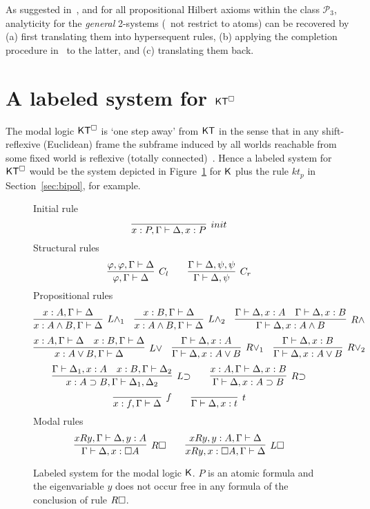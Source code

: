 \documentclass{llncs}
\begin{document}
As suggested in~\cite{DBLP:journals/tocl/CiabattoniG18}, and for all propositional Hilbert axioms within the class $\mathcal{P}_3$, analyticity for the {\em general} 2-systems (\ie\ not restrict to atoms) can be recovered by (a) first translating them into hypersequent rules, (b) applying the completion procedure in~\cite{DBLP:conf/lics/CiabattoniGT08} to the latter, and (c) translating them back. 


\section{A labeled system for $\mathsf{K}\mathsf{T}^\Box$}
The modal logic $\mathsf{K}\mathsf{T}^\Box$ is `one step away' from  $\mathsf{K}\mathsf{T}$ in the sense that in any shift-reflexive (Euclidean) frame the subframe induced by all worlds reachable from some fixed world is reflexive (totally connected)~\cite{DBLP:conf/tableaux/Lang23}. Hence a labeled system for $\mathsf{K}\mathsf{T}^\Box$ would be the system depicted in Figure~\ref{fig:labk} for $\mathsf{K}$ plus the rule $kt_p$ in Section~\ref{sec:bipol}, for example.

\begin{figure}[t]%
{\sc Initial rule}
\[
  \infer[\init]{{x:P,\Gamma}\vdash{\Delta, x:P}}{}
\]
{\sc Structural rules}	
\[
  \infer[C_l]{\varphi, \Gamma \vdash \Delta}{\varphi, \varphi, \Gamma \vdash \Delta}
  \qquad
  \infer[C_r]{\Gamma \vdash \Delta, \psi}{\Gamma \vdash \Delta, \psi, \psi}
\]
{\sc Propositional rules}
\[
  \infer[\lwedge_1]{x:A\wedge B, \Gamma \vdash \Delta}{x:A, \Gamma \vdash \Delta}
  \quad
    \infer[\lwedge_2]{x:A\wedge B, \Gamma \vdash \Delta}{x:B, \Gamma \vdash \Delta}
 \quad
  \infer[\rwedge]{\Gamma \vdash \Delta, x:A \wedge B}{\Gamma \vdash \Delta, x:A & \Gamma \vdash \Delta, x:B}	
\]
\[
  \infer[\lvee]{x:A\vee B, \Gamma \vdash \Delta}{x:A,\Gamma \vdash \Delta & x:B,\Gamma \vdash \Delta}
  \quad
  \infer[\rvee_1]{\Gamma \vdash \Delta, x:A \vee B}{\Gamma \vdash \Delta, x:A}
  \quad
  \infer[\rvee_2]{\Gamma \vdash \Delta, x:A \vee B}{\Gamma \vdash \Delta, x:B}
\]
\[
  \infer[\limpl]{x:A\impl B, \Gamma \vdash \Delta_1,\Delta_2}{\Gamma \vdash \Delta_1, x:A & x:B,\Gamma \vdash \Delta_2}
  \qquad
  \infer[\rimpl]{\Gamma \vdash \Delta, x:A \impl B}{x:A, \Gamma \vdash \Delta, x:B}
\]
\[
  \infer[f]{x:f, \Gamma \vdash \Delta}{}
  \qquad
  \infer[t]{\Gamma \vdash \Delta,x:t}{}
\]
{\sc Modal rules}
\[
  \infer[\rbox]{\Gamma \vdash \Delta, x:\square A}{x \rel y, \Gamma \vdash \Delta, y:A} \qquad
  \infer[\lbox]{x \rel y,x:\Box A, \Gamma \vdash \Delta}{x \rel y, y:A,\Gamma \vdash \Delta}
\]
\caption{Labeled system for the modal logic $\mathsf{K}$. $P$ is an atomic formula
  and the eigenvariable $y$ does not occur free in any formula of the
  conclusion of rule $R\square$.}
\label{fig:labk}
\end{figure}	
\end{document}
